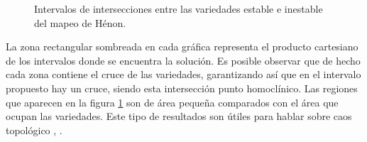 \begin{figure}[htbp]
\vspace{0mm}
\caption{Intervalos de intersecciones entre las variedades estable e inestable del mapeo de Hénon.} \label{matriz_cortes}
\end{figure}










La zona rectangular sombreada en cada gráfica representa el producto cartesiano de los intervalos donde se encuentra la solución. Es posible observar que de hecho cada zona contiene el cruce de las variedades, garantizando así que en el intervalo propuesto hay un cruce, siendo esta intersección punto homoclínico. Las regiones que aparecen en la figura \ref{matriz_cortes} son de área pequeña comparados con el área que ocupan las variedades. Este tipo de resultados son útiles para hablar sobre caos topológico \cite{devaney}, \cite{gerald}.\\

